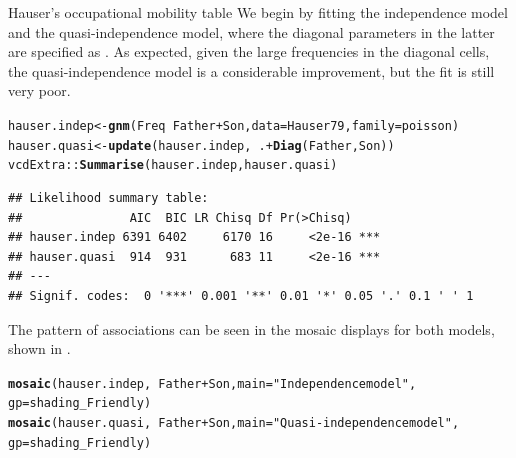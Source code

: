 \documentclass[11pt]{book}\usepackage[]{graphicx}\usepackage[]{color}
\makeatletter
\newcommand{\hlstr}[1]{\textcolor[rgb]{0.192,0.494,0.8}{#1}}%
\newcommand{\hlopt}[1]{\textcolor[rgb]{0,0,0}{#1}}%
\newcommand{\hlstd}[1]{\textcolor[rgb]{0.345,0.345,0.345}{#1}}%
\newcommand{\hlkwb}[1]{\textcolor[rgb]{0.69,0.353,0.396}{#1}}%
\newcommand{\hlkwc}[1]{\textcolor[rgb]{0.333,0.667,0.333}{#1}}%
\newcommand{\hlkwd}[1]{\textcolor[rgb]{0.737,0.353,0.396}{\textbf{#1}}}%
\newenvironment{kframe}{%
 \def\at@end@of@kframe{}%
 \ifinner\ifhmode%
  \def\at@end@of@kframe{\end{minipage}}%
  \begin{minipage}{\columnwidth}%
 \fi\fi%
 \def\FrameCommand##1{\hskip\@totalleftmargin \hskip-\fboxsep
 \colorbox{shadecolor}{##1}\hskip-\fboxsep
     \hskip-\linewidth \hskip-\@totalleftmargin \hskip\columnwidth}%
 \MakeFramed {\advance\hsize-\width
   \@totalleftmargin\z@ \linewidth\hsize
   \@setminipage}}%
 {\par\unskip\endMakeFramed%
 \at@end@of@kframe}
\newenvironment{knitrout}{}{} %
\renewenvironment{knitrout}{\small\renewcommand{\baselinestretch}{.85}}{} %
\makeatother
\begin{document}
\begin{Example}[hauser1]{Hauser's occupational mobility table}
We begin by fitting the independence model and the quasi-independence model,
where the diagonal parameters in the latter are specified as
.
As expected, given the large frequencies in the diagonal cells,
the quasi-independence model is a considerable improvement, but the fit
is still very poor.
\begin{knitrout}
\color{fgcolor}\begin{kframe}
\begin{alltt}
\hlstd{hauser.indep} \hlkwb{<-} \hlkwd{gnm}\hlstd{(Freq} \hlopt{~} \hlstd{Father} \hlopt{+} \hlstd{Son,} \hlkwc{data}\hlstd{=Hauser79,} \hlkwc{family}\hlstd{=poisson)}
\hlstd{hauser.quasi} \hlkwb{<-}  \hlkwd{update}\hlstd{(hauser.indep,} \hlopt{~} \hlstd{.} \hlopt{+} \hlkwd{Diag}\hlstd{(Father,Son))}
\hlstd{vcdExtra::}\hlkwd{Summarise}\hlstd{(hauser.indep, hauser.quasi)}
\end{alltt}
\begin{verbatim}
## Likelihood summary table:
##               AIC  BIC LR Chisq Df Pr(>Chisq)    
## hauser.indep 6391 6402     6170 16     <2e-16 ***
## hauser.quasi  914  931      683 11     <2e-16 ***
## ---
## Signif. codes:  0 '***' 0.001 '**' 0.01 '*' 0.05 '.' 0.1 ' ' 1
\end{verbatim}
\end{kframe}
\end{knitrout}
The pattern of associations can be seen in the mosaic displays for
both models, shown in .
\begin{knitrout}
\color{fgcolor}\begin{kframe}
\begin{alltt}
\hlkwd{mosaic}\hlstd{(hauser.indep,} \hlopt{~}\hlstd{Father}\hlopt{+}\hlstd{Son,} \hlkwc{main}\hlstd{=}\hlstr{"Independence model"}\hlstd{,}
       \hlkwc{gp}\hlstd{=shading_Friendly)}
\hlkwd{mosaic}\hlstd{(hauser.quasi,} \hlopt{~}\hlstd{Father}\hlopt{+}\hlstd{Son,} \hlkwc{main}\hlstd{=}\hlstr{"Quasi-independence model"}\hlstd{,}
       \hlkwc{gp}\hlstd{=shading_Friendly)}
\end{alltt}
\end{kframe}\begin{figure}[!htbp]



\end{figure}
\end{knitrout}
\end{Example}
\end{document}

